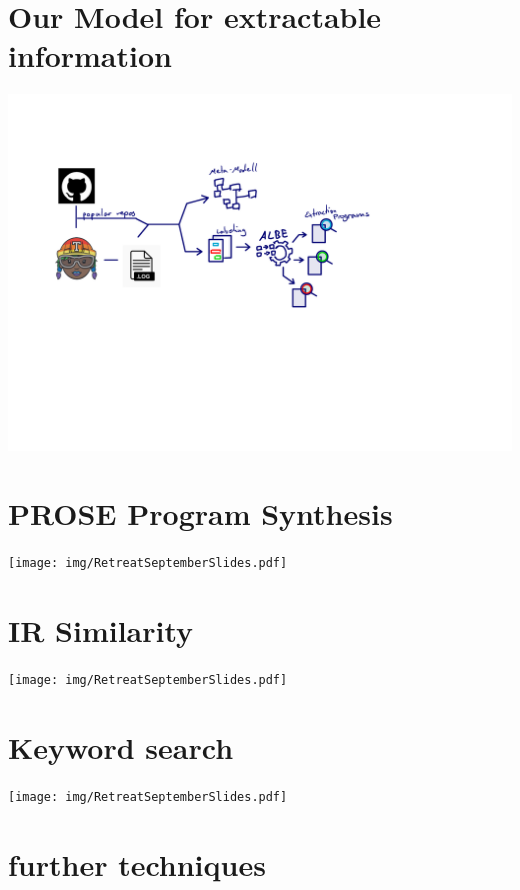 \documentclass[\myrootdir/main.tex]{subfiles}
\begin{document}
\section{Our Model for extractable information}
\includegraphics[page=2, width=\textwidth, trim={0.5cm 0.5cm 0.5cm 0.5cm}, clip]{img/flow-of-research.pdf}


\section{PROSE Program Synthesis}
\texttt{[image: img/RetreatSeptemberSlides.pdf]}

\section{IR Similarity}
\texttt{[image: img/RetreatSeptemberSlides.pdf]}

\section{Keyword search}
\texttt{[image: img/RetreatSeptemberSlides.pdf]}

\section{further techniques}
\end{document}
